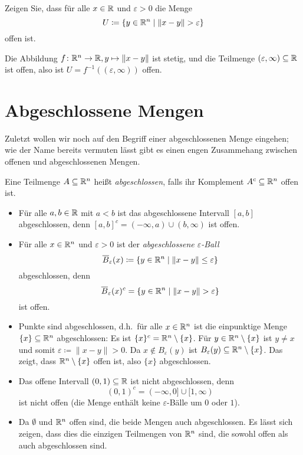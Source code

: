\documentclass[a4paper,10pt]{article}
\begin{document}
\begin{question}
 Zeigen Sie, dass für alle $x \in \mathbb{R}$ und $\varepsilon > 0$ die Menge
 \[
  U \coloneqq \{y \in \mathbb{R}^n \mid \|x-y\| > \varepsilon\}
 \]
 offen ist.
\end{question}
\begin{solution}
 Die Abbildung $f \colon \mathbb{R}^n \to \mathbb{R}, y \mapsto \|x-y\|$ ist stetig, und die Teilmenge $(\varepsilon,\infty) \subseteq \mathbb{R}$ ist offen, also ist $U = f^{-1}((\varepsilon,\infty))$ offen.
\end{solution}





\section{Abgeschlossene Mengen}


Zuletzt wollen wir noch auf den Begriff einer abgeschlossenen Menge eingehen; wie der Name bereits vermuten lässt gibt es einen engen Zusammehang zwischen offenen und abgeschlossenen Mengen.


\begin{defi}
 Eine Teilmenge $A \subseteq \mathbb{R}^n$ heißt \emph{abgeschlossen}, falls ihr Komplement $A^c \subseteq \mathbb{R}^n$ offen ist.
\end{defi}


\begin{bsp}
 \begin{itemize}
  \item
   Für alle $a,b \in \mathbb{R}$ mit $a < b$ ist das abgeschlossene Intervall $[a,b]$ abgeschlossen, denn $[a,b]^c = (-\infty,a) \cup (b, \infty)$ ist offen.
  \item
   Für alle $x \in \mathbb{R}^n$ und $\varepsilon > 0$ ist der \emph{abgeschlossene $\varepsilon$-Ball}
   \[
    \overline{B}_\varepsilon(x) \coloneqq \{y \in \mathbb{R}^n \mid \|x-y\| \leq \varepsilon\}
   \]
   abgeschlossen, denn
   \[
    \overline{B}_\varepsilon(x)^c = \{y \in \mathbb{R}^n \mid \|x-y\| > \varepsilon\}
   \]
   ist offen.
  \item
   Punkte sind abgeschlossen, d.h.\ für alle $x \in \mathbb{R}^n$ ist die einpunktige Menge $\{x\} \subseteq \mathbb{R}^n$ abgeschlossen: Es ist $\{x\}^c = \mathbb{R}^n \setminus \{x\}$. Für $y \in \mathbb{R}^n \setminus \{x\}$ ist $y \neq x$ und somit $\varepsilon \coloneqq \|x-y\| > 0$. Da $x \notin B_\varepsilon(y)$ ist $B_\varepsilon(y) \subseteq \mathbb{R}^n \setminus \{x\}$. Das zeigt, dass $\mathbb{R}^n \setminus \{x\}$ offen ist, also $\{x\}$ abgeschlossen.
  \item
   Das offene Intervall $(0,1) \subseteq \mathbb{R}$ ist nicht abgeschlossen, denn
   \[
    (0,1)^c = (-\infty,0] \cup [1,\infty)
   \]
   ist nicht offen (die Menge enthält keine $\varepsilon$-Bälle um $0$ oder $1$).
  \item
   Da $\emptyset$ und $\mathbb{R}^n$ offen sind, die beide Mengen auch abgeschlossen. Es lässt sich zeigen, dass dies die einzigen Teilmengen von $\mathbb{R}^n$ sind, die sowohl offen als auch abgeschlossen sind.
 \end{itemize}
\end{bsp}
\end{document}

